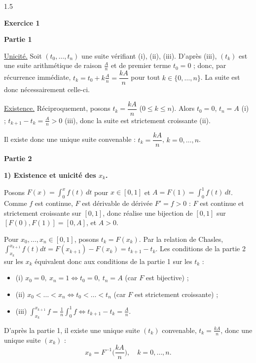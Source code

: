 \documentclass[12pt]{article}
\begin{document}
\begin{spacing}{1.5}

\textbf{Exercice 1}

\textbf{Partie 1}


\underline{Unicité.} Soit $(t_0,\dots,t_n)$ une suite vérifiant (i), (ii), (iii). D'après (iii), $(t_k)$ est une suite arithmétique de raison $\frac An$ et de premier terme $t_0=0$ ; donc, par récurrence immédiate, $t_k=t_0+k\frac An=\dfrac{kA}{n}$ pour tout $k\in\{0,\dots,n\}$. La suite est donc nécessairement celle-ci.

\underline{Existence.} Réciproquement, posons $t_k=\dfrac{kA}{n}$ ($0\le k\le n$). Alors $t_0=0$, $t_n=A$ (i) ; $t_{k+1}-t_k=\frac An>0$ (iii), donc la suite est strictement croissante (ii).

Il existe donc une unique suite convenable : $\boxed{t_k=\dfrac{kA}{n}}$, $k=0,\dots,n$.

\textbf{Partie 2}

\textbf{1) Existence et unicité des $x_k$.}

Posons $F(x)=\displaystyle\int_0^xf(t)\,dt$ pour $x\in[0,1]$ et $A=F(1)=\displaystyle\int_0^1f(t)\,dt$. Comme $f$ est continue, $F$ est dérivable de dérivée $F'=f>0$ : $F$ est continue et strictement croissante sur $[0,1]$, donc réalise une bijection de $[0,1]$ sur $[F(0),F(1)]=[0,A]$, et $A>0$.

Pour $x_0,\dots,x_n\in[0,1]$, posons $t_k=F(x_k)$. Par la relation de Chasles, $\displaystyle\int_{x_k}^{x_{k+1}}f(t)dt=F(x_{k+1})-F(x_k)=t_{k+1}-t_k$. Les conditions de la partie 2 sur les $x_k$ équivalent donc aux conditions de la partie 1 sur les $t_k$ :
\begin{itemize}
\item (i) $x_0=0,\ x_n=1\iff t_0=0,\ t_n=A$ (car $F$ est bijective) ;
\item (ii) $x_0<\dots<x_n\iff t_0<\dots<t_n$ (car $F$ est strictement croissante) ;
\item (iii) $\displaystyle\int_{x_k}^{x_{k+1}}f=\frac1n\int_0^1f\iff t_{k+1}-t_k=\frac An$.
\end{itemize}
D'après la partie 1, il existe une unique suite $(t_k)$ convenable, $t_k=\frac{kA}{n}$, donc une unique suite $(x_k)$ :
\[
\boxed{x_k=F^{-1}\Big(\frac{kA}{n}\Big),\quad k=0,\dots,n}.
\]


\end{spacing}
\end{document}
